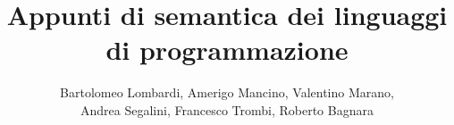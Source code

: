 \documentclass[12pt,a4]{book}
\begin{document}
\title{Appunti di semantica dei linguaggi di programmazione}
\author{Bartolomeo Lombardi, Amerigo Mancino, Valentino Marano, \\
        Andrea Segalini, Francesco Trombi, Roberto Bagnara}

\maketitle

\tableofcontents













\end{document}
